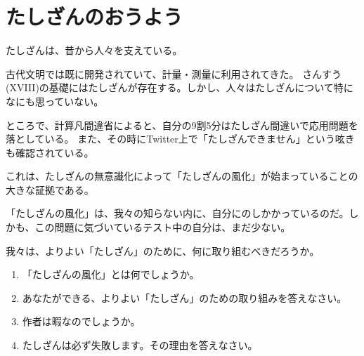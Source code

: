 \documentclass[twocolumn, a4paper]{ltjsarticle}
\newenvironment{greaterbox}[1]{ %
    \begin{tcolorbox}[
        colframe = Maroon,
        colback = Dandelion!20!Brown!10!White,
        title = {#1},
        fonttitle = \color{White} \bfseries,
        breakable = true
    ]
}{
    \end{tcolorbox}
}
\begin{document}
\newpage

\section{たしざんのおうよう}

\begin{greaterbox}{より良いたしざんのために}
    たしざんは、昔から人々を支えている。

    古代文明では既に開発されていて、計量・測量に利用されてきた。
    さんすう(X\hspace{-1.2pt}V\hspace{-1.2pt}I\hspace{-1.2pt}I\hspace{-1.2pt}I)の基礎にはたしざんが存在する。しかし、人々はたしざんについて特になにも思っていない。

    ところで、計算凡間違省によると、自分の9割5分はたしざん間違いで応用問題を落としている。
    また、その時にTwitter上で「たしざんできません」という呟きも確認されている。

    これは、たしざんの無意識化によって「たしざんの風化」が始まっていることの大きな証拠である。

    「たしざんの風化」は、我々の知らない内に、自分にのしかかっているのだ。しかも、この問題に気づいているテスト中の自分は、まだ少ない。

    我々は、よりよい「たしざん」のために、何に取り組むべきだろうか。
    \tcblower
    \begin{enumerate}[Q1: ]
        \item 「たしざんの風化」とは何でしょうか。
        \item あなたができる、よりよい「たしざん」のための取り組みを答えなさい。
        \item 作者は暇なのでしょうか。
        \item たしざんは必ず失敗します。その理由を答えなさい。
    \end{enumerate}
\end{greaterbox}
\end{document}
